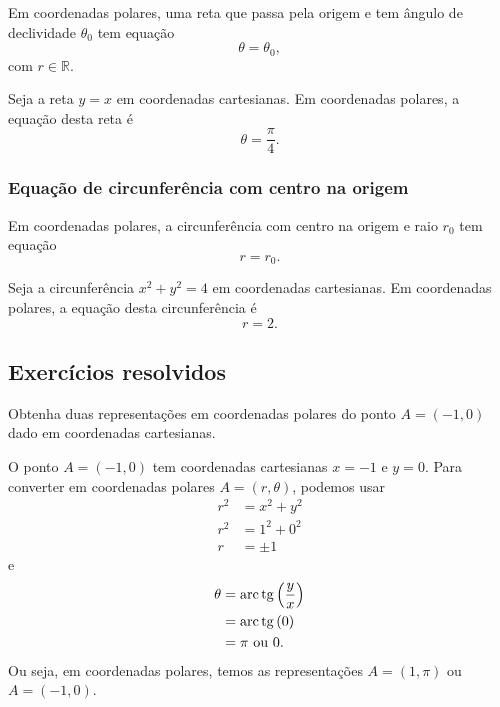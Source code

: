 Em coordenadas polares, uma reta que passa pela origem e tem ângulo de declividade $\theta_0$ tem equação
\begin{equation}
  \theta = \theta_0,
\end{equation}
com $r\in\mathbb{R}$.

\begin{ex}
  Seja a reta $y=x$ em coordenadas cartesianas. Em coordenadas polares, a equação desta reta é
  \begin{equation}
    \theta = \frac{\pi}{4}.
  \end{equation}
\end{ex}

\subsubsection{Equação de circunferência com centro na origem}

Em coordenadas polares, a circunferência com centro na origem e raio $r_0$ tem equação
\begin{equation}
  r = r_0.
\end{equation}

\begin{ex}
  Seja a circunferência $x^2 + y^2 = 4$ em coordenadas cartesianas. Em coordenadas polares, a equação desta circunferência é
  \begin{equation}
    r = 2.
  \end{equation}
\end{ex}

\subsection{Exercícios resolvidos}

\begin{exeresol}
  Obtenha duas representações em coordenadas polares do ponto $A=(-1,0)$ dado em coordenadas cartesianas.
\end{exeresol}
\begin{resol}
  O ponto $A=(-1, 0)$ tem coordenadas cartesianas $x=-1$ e $y=0$. Para converter em coordenadas polares $A=(r, \theta)$, podemos usar
  \begin{align}
    r^2 &= x^2 + y^2 \\
    r^2  &= 1^2 + 0^2 \\
    r  &= \pm 1
  \end{align}
  e
  \begin{align}
    \theta &= \operatorname{arc}\operatorname{tg}\left(\frac{y}{x}\right) \\
           &= \operatorname{arc}\operatorname{tg}\left(0\right) \\
           &= \pi\text{ ou }0. 
  \end{align}
  Ou seja, em coordenadas polares, temos as representações $A=(1, \pi)$ ou $A=(-1,0)$.
\end{resol}


